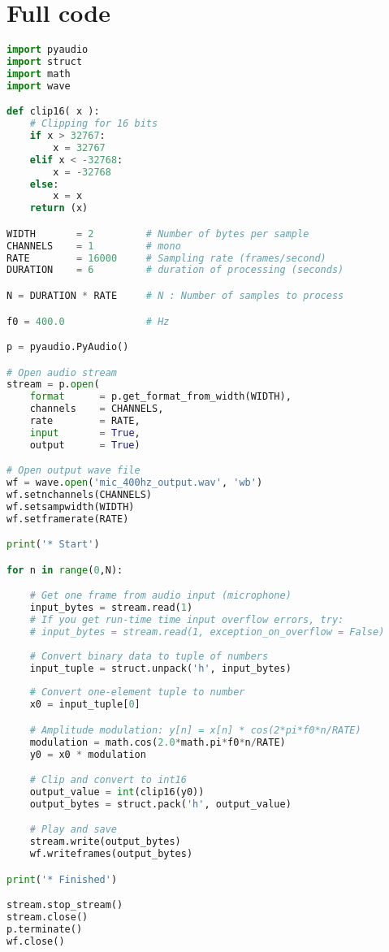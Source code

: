 \documentclass[11pt]{article}
\begin{document}
\pagebreak

\section*{Full code}


\begin{lstlisting}[language=python, label={lst:code}, breaklines=true, caption={example code}]
import pyaudio
import struct
import math
import wave

def clip16( x ):    
    # Clipping for 16 bits
    if x > 32767:
        x = 32767
    elif x < -32768:
        x = -32768
    else:
        x = x        
    return (x)

WIDTH       = 2         # Number of bytes per sample
CHANNELS    = 1         # mono
RATE        = 16000     # Sampling rate (frames/second)
DURATION    = 6         # duration of processing (seconds)

N = DURATION * RATE     # N : Number of samples to process

f0 = 400.0              # Hz

p = pyaudio.PyAudio()

# Open audio stream
stream = p.open(
    format      = p.get_format_from_width(WIDTH),
    channels    = CHANNELS,
    rate        = RATE,
    input       = True,
    output      = True)

# Open output wave file
wf = wave.open('mic_400hz_output.wav', 'wb')
wf.setnchannels(CHANNELS)
wf.setsampwidth(WIDTH)
wf.setframerate(RATE)

print('* Start')

for n in range(0,N):

    # Get one frame from audio input (microphone)
    input_bytes = stream.read(1)
    # If you get run-time time input overflow errors, try:
    # input_bytes = stream.read(1, exception_on_overflow = False)
    
    # Convert binary data to tuple of numbers
    input_tuple = struct.unpack('h', input_bytes)
    
    # Convert one-element tuple to number
    x0 = input_tuple[0]

    # Amplitude modulation: y[n] = x[n] * cos(2*pi*f0*n/RATE)
    modulation = math.cos(2.0*math.pi*f0*n/RATE)
    y0 = x0 * modulation

    # Clip and convert to int16
    output_value = int(clip16(y0))
    output_bytes = struct.pack('h', output_value)

    # Play and save
    stream.write(output_bytes)
    wf.writeframes(output_bytes)

print('* Finished')

stream.stop_stream()
stream.close()
p.terminate()
wf.close()

\end{lstlisting}    
    
\end{document}
